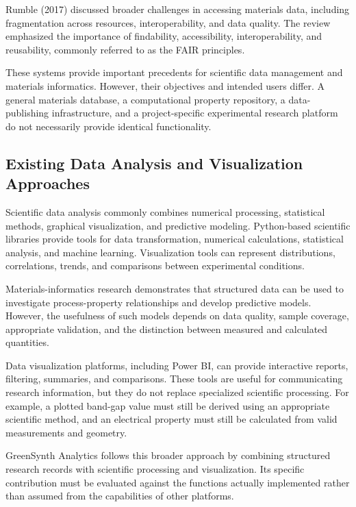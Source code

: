 \documentclass[12pt,a4paper,oneside]{report}
\begin{document}
{{{Rumble (2017) discussed broader challenges in accessing materials data, including fragmentation across resources, interoperability, and data quality. The review emphasized the importance of findability, accessibility, interoperability, and reusability, commonly referred to as the FAIR principles.

These systems provide important precedents for scientific data management and materials informatics. However, their objectives and intended users differ. A general materials database, a computational property repository, a data-publishing infrastructure, and a project-specific experimental research platform do not necessarily provide identical functionality.

\subsection{Existing Data Analysis and Visualization Approaches}

Scientific data analysis commonly combines numerical processing, statistical methods, graphical visualization, and predictive modeling. Python-based scientific libraries provide tools for data transformation, numerical calculations, statistical analysis, and machine learning. Visualization tools can represent distributions, correlations, trends, and comparisons between experimental conditions.

Materials-informatics research demonstrates that structured data can be used to investigate process-property relationships and develop predictive models. However, the usefulness of such models depends on data quality, sample coverage, appropriate validation, and the distinction between measured and calculated quantities.

Data visualization platforms, including Power BI, can provide interactive reports, filtering, summaries, and comparisons. These tools are useful for communicating research information, but they do not replace specialized scientific processing. For example, a plotted band-gap value must still be derived using an appropriate scientific method, and an electrical property must still be calculated from valid measurements and geometry.

GreenSynth Analytics follows this broader approach by combining structured research records with scientific processing and visualization. Its specific contribution must be evaluated against the functions actually implemented rather than assumed from the capabilities of other platforms.

}}}
\end{document}
